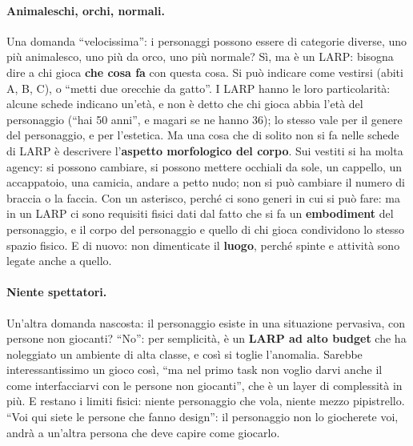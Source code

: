 \paragraph{Animaleschi, orchi, normali.} Una domanda ``velocissima'': i personaggi
possono essere di categorie diverse, uno più animalesco, uno più da orco, uno più
normale? Sì, ma è un LARP: bisogna dire a chi gioca \textbf{che cosa fa} con questa
cosa. Si può indicare come vestirsi (abiti A, B, C), o ``metti due orecchie da
gatto''. I LARP hanno le loro particolarità: alcune schede indicano un'età, e non è
detto che chi gioca abbia l'età del personaggio (``hai 50 anni'', e magari se ne
hanno 36); lo stesso vale per il genere del personaggio, e per l'estetica. Ma una
cosa che di solito non si fa nelle schede di LARP è descrivere l'\textbf{aspetto
morfologico del corpo}. Sui vestiti si ha molta agency: si possono cambiare, si
possono mettere occhiali da sole, un cappello, un accappatoio, una camicia, andare a
petto nudo; non si può cambiare il numero di braccia o la faccia. Con un asterisco,
perché ci sono generi in cui si può fare: ma in un LARP ci sono requisiti fisici
dati dal fatto che si fa un \textbf{embodiment} del personaggio, e il corpo del
personaggio e quello di chi gioca condividono lo stesso spazio fisico. E di nuovo:
non dimenticate il \textbf{luogo}, perché spinte e attività sono legate anche a quello.

\paragraph{Niente spettatori.} Un'altra domanda nascosta: il personaggio esiste in
una situazione pervasiva, con persone non giocanti? ``No'': per semplicità, è un
\textbf{LARP ad alto budget} che ha noleggiato un ambiente di alta classe, e così si
toglie l'anomalia. Sarebbe interessantissimo un gioco così, ``ma nel primo task non
voglio darvi anche il come interfacciarvi con le persone non giocanti'', che è un
layer di complessità in più. E restano i limiti fisici: niente personaggio che vola,
niente mezzo pipistrello. ``Voi qui siete le persone che fanno design'': il
personaggio non lo giocherete voi, andrà a un'altra persona che deve capire come
giocarlo.

